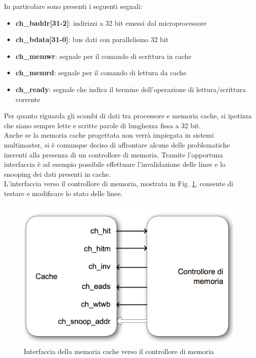 In particolare sono presenti i seguenti segnali:
\begin{itemize} %
\item \textbf{ch\_baddr[31-2]}: indirizzi a 32 bit emessi dal microprocessore
\item \textbf{ch\_bdata[31-0]}: bus dati con parallelismo 32 bit 
\item \textbf{ch\_memwr}: segnale per il comando di scrittura in cache
\item \textbf{ch\_memrd}: segnale per il comando di lettura da cache
\item \textbf{ch\_ready}: segnale che indica il termine dell'operazione di lettura/scrittura corrente
\end{itemize}

Per quanto riguarda gli scambi di dati tra processore e memoria cache, si ipotizza che siano sempre lette e scritte parole di lunghezza fissa a 32 bit.\\

Anche se la memoria cache progettata non verr\`a impiegata in sistemi multimaster, si \`e comunque deciso di affrontare alcune delle problematiche inerenti alla presenza di un controllore di memoria. Tramite l'opportuna interfaccia \`e ad esempio possibile effettuare l'invalidazione delle linee e lo snooping dei dati presenti in cache.\\

L'interfaccia verso il controllore di memoria, mostrata in Fig. \ref{fig:int_cnt}, consente di testare e modificare lo stato delle linee.\\

\begin{figure}[h!]
\centering
\includegraphics[width=\textwidth]{img/cache/control.png}
\caption{Interfaccia della memoria cache verso il controllore di memoria}
\label{fig:int_cnt}
\end{figure}

